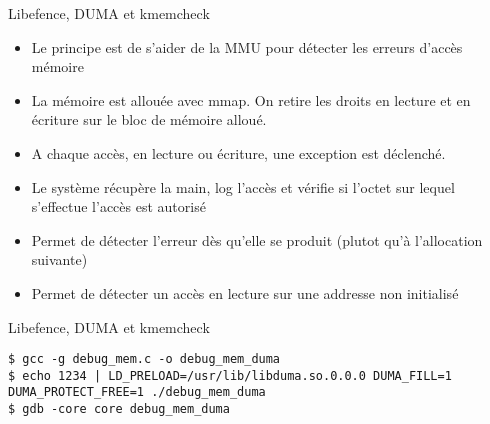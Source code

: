 \begin{frame}[fragile=singleslide]{Libefence, DUMA et kmemcheck}
  \begin{itemize}
  \item Le principe est de s'aider de la MMU pour détecter les erreurs
    d'accès mémoire
  \item  La mémoire est  allouée avec  mmap. On  retire les  droits en
    lecture et en écriture sur le bloc de mémoire alloué.
  \item  A chaque  accès, en  lecture ou  écriture, une  exception est
    déclenché.
  \item Le système récupère la main, log l'accès et vérifie si l'octet
    sur lequel s'effectue l'accès est autorisé
  \item  Permet de détecter  l'erreur dès  qu'elle se  produit (plutot
    qu'à l'allocation suivante)
  \item Permet  de détecter un accès  en lecture sur  une addresse non
    initialisé
  \end{itemize}
\end{frame}

\begin{frame}[fragile=singleslide]{Libefence, DUMA et kmemcheck}
  \begin{lstlisting}
$ gcc -g debug_mem.c -o debug_mem_duma
$ echo 1234 | LD_PRELOAD=/usr/lib/libduma.so.0.0.0 DUMA_FILL=1 DUMA_PROTECT_FREE=1 ./debug_mem_duma
$ gdb -core core debug_mem_duma
  \end{lstlisting}
\end{frame}

